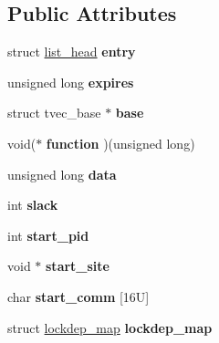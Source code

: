 \subsection*{Public Attributes}
\begin{DoxyCompactItemize}
\item 
\hypertarget{structtimer__list_ad089bb5933f16672df827d393131a681}{}struct \hyperlink{structlist__head}{list\+\_\+head} {\bfseries entry}\label{structtimer__list_ad089bb5933f16672df827d393131a681}

\item 
\hypertarget{structtimer__list_afdb204dba2d2b902544255dea285c8bd}{}unsigned long {\bfseries expires}\label{structtimer__list_afdb204dba2d2b902544255dea285c8bd}

\item 
\hypertarget{structtimer__list_a0d59afaf714cc3f5971ad936a697318d}{}struct tvec\+\_\+base $\ast$ {\bfseries base}\label{structtimer__list_a0d59afaf714cc3f5971ad936a697318d}

\item 
\hypertarget{structtimer__list_af24b806c89fae0878bb0cf6a41ad8f64}{}void($\ast$ {\bfseries function} )(unsigned long)\label{structtimer__list_af24b806c89fae0878bb0cf6a41ad8f64}

\item 
\hypertarget{structtimer__list_af135d46b30969e13bfa66d6760c795f2}{}unsigned long {\bfseries data}\label{structtimer__list_af135d46b30969e13bfa66d6760c795f2}

\item 
\hypertarget{structtimer__list_af29616d6e9aae8a6ac3ae3b0807a5a43}{}int {\bfseries slack}\label{structtimer__list_af29616d6e9aae8a6ac3ae3b0807a5a43}

\item 
\hypertarget{structtimer__list_adc68e947949c3861e3fe8ab77968c571}{}int {\bfseries start\+\_\+pid}\label{structtimer__list_adc68e947949c3861e3fe8ab77968c571}

\item 
\hypertarget{structtimer__list_a62425a1028e7922f4aa77075ac3857ea}{}void $\ast$ {\bfseries start\+\_\+site}\label{structtimer__list_a62425a1028e7922f4aa77075ac3857ea}

\item 
\hypertarget{structtimer__list_a6f24ee09be93bf58b741fd116f23ff2e}{}char {\bfseries start\+\_\+comm} \mbox{[}16\+U\mbox{]}\label{structtimer__list_a6f24ee09be93bf58b741fd116f23ff2e}

\item 
\hypertarget{structtimer__list_a8fe7e4fb1c2b7bbd6678f09135e69fe0}{}struct \hyperlink{structlockdep__map}{lockdep\+\_\+map} {\bfseries lockdep\+\_\+map}\label{structtimer__list_a8fe7e4fb1c2b7bbd6678f09135e69fe0}

\end{DoxyCompactItemize}


